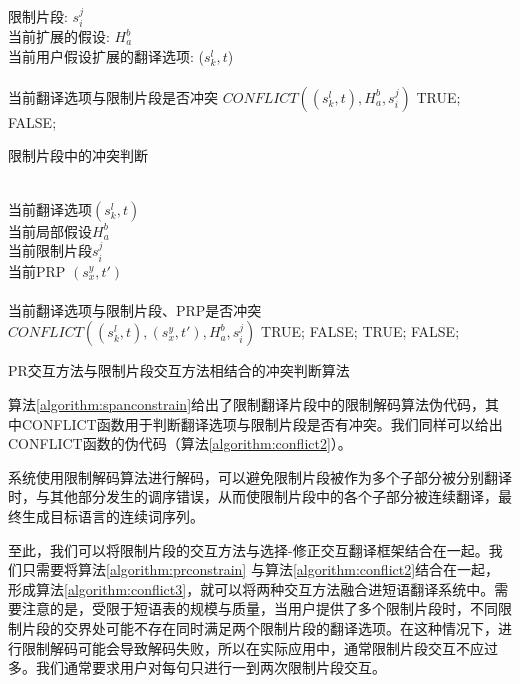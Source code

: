 \documentclass[master, winfont]{njuthesis}
\begin{document}
\begin{algorithm}
\begin{algorithmic}[1]
\REQUIRE ~~ \\
限制片段: $s_i^j$\\
当前扩展的假设: $H_a^b$\\
当前用户假设扩展的翻译选项: ($s_k^l, t$)\\
\ENSURE ~~ \\
当前翻译选项与限制片段是否冲突
\STATE $CONFLICT((s_k^l, t), H_a^b, s_i^j)$
            \RETURN TRUE;
        \ENDIF
    \ENDIF
\ENDIF
\RETURN FALSE;
\end{algorithmic}
\caption{限制片段中的冲突判断}
\label{algorithm:conflict2}
\end{algorithm}

\begin{algorithm}
\begin{algorithmic}[1]
\REQUIRE ~~ \\
当前翻译选项$(s_k^l, t)$\\
当前局部假设$H_a^b$\\
当前限制片段$s_i^j$\\
当前PRP $(s_x^y, t')$\\
\ENSURE ~~ \\
当前翻译选项与限制片段、PRP是否冲突
\STATE $CONFLICT((s_k^l, t), (s_x^y, t'), H_a^b, s_i^j)$
            \RETURN TRUE;
        \ENDIF
    \ENDIF
\ENDIF
{}
        \RETURN FALSE;
    \ENDIF
    \RETURN TRUE;
\ENDIF
\RETURN FALSE;
\end{algorithmic}
\caption{PR交互方法与限制片段交互方法相结合的冲突判断算法}
\label{algorithm:conflict3}
\end{algorithm}

算法\ref{algorithm:spanconstrain}给出了限制翻译片段中的限制解码算法伪代码，其中CONFLICT函数用于判断翻译选项与限制片段是否有冲突。我们同样可以给出CONFLICT函数的伪代码（算法\ref{algorithm:conflict2}）。

系统使用限制解码算法进行解码，可以避免限制片段被作为多个子部分被分别翻译时，与其他部分发生的调序错误，从而使限制片段中的各个子部分被连续翻译，最终生成目标语言的连续词序列。

至此，我们可以将限制片段的交互方法与选择-修正交互翻译框架结合在一起。我们只需要将算法\ref{algorithm:prconstrain} 与算法\ref{algorithm:conflict2}结合在一起，形成算法\ref{algorithm:conflict3}，就可以将两种交互方法融合进短语翻译系统中。需要注意的是，受限于短语表的规模与质量，当用户提供了多个限制片段时，不同限制片段的交界处可能不存在同时满足两个限制片段的翻译选项。在这种情况下，进行限制解码可能会导致解码失败，所以在实际应用中，通常限制片段交互不应过多。我们通常要求用户对每句只进行一到两次限制片段交互。
\end{document}
